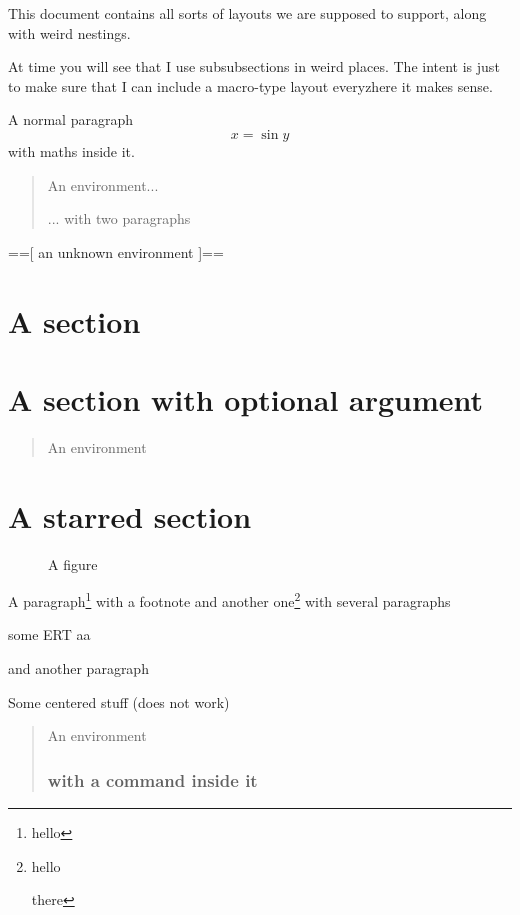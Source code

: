 \documentclass[legalpaper]{article}
\newenvironment{foo}{==[}{]==}
\begin{document}
This document contains all sorts of layouts we are supposed to
support, along with weird nestings.

At time you will see that I use subsubsections in weird places. The
intent is just to make sure that I can include a macro-type layout
everyzhere it makes sense.

A normal paragraph
\begin{equation}
x = \sin y
\end{equation}
with maths inside it.

\begin{quote}
An environment...

... with two paragraphs
\end{quote}

\begin{foo}
an unknown environment
\end{foo}


\section{A section}

\section[Hello!]{A section with optional argument}

\begin{quote}
An environment
\end{quote}

\section*{A starred section}

\begin{figure}
\caption{A figure}
\end{figure}

A paragraph\footnote{hello} with a footnote and another
one\footnote{hello

there} with several paragraphs

some ERT \vspace{1cm} aa

and another paragraph

\begin{center}
Some centered stuff (does not work)
\end{center}

\begin{quotation}
An environment

\subsubsection*{with a command inside it}
\end{quotation}
\end{document}
